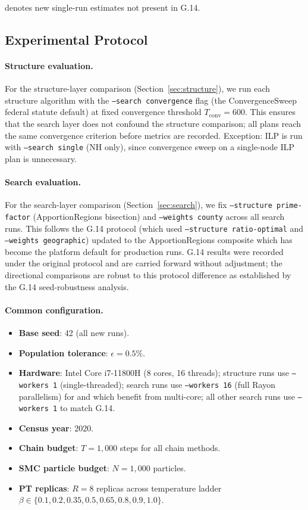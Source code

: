 \dag{} denotes new single-run estimates not present in G.14.

\subsection{Experimental Protocol}

\paragraph{Structure evaluation.}
For the structure-layer comparison (Section~\ref{sec:structure}), we run each
structure algorithm with the \texttt{--search convergence} flag (the
ConvergenceSweep federal statute default) at fixed convergence threshold
$T_{\mathrm{conv}} = 600$.
This ensures that the search layer does not confound the structure comparison;
all plans reach the same convergence criterion before metrics are recorded.
Exception: ILP is run with \texttt{--search single} (NH only), since
convergence sweep on a single-node ILP plan is unnecessary.

\paragraph{Search evaluation.}
For the search-layer comparison (Section~\ref{sec:search}), we fix
\texttt{--structure prime-factor} (ApportionRegions bisection) and
\texttt{--weights county} across all search runs.
This follows the G.14 protocol (which used \texttt{--structure ratio-optimal}
and \texttt{--weights geographic}) updated to the ApportionRegions composite
which has become the platform default for production runs.
G.14 results were recorded under the original protocol and are carried forward
without adjustment; the directional comparisons are robust to this protocol
difference as established by the G.14 seed-robustness analysis.

\paragraph{Common configuration.}
\begin{itemize}
  \item \textbf{Base seed}: 42 (all new runs).
  \item \textbf{Population tolerance}: $\epsilon = 0.5\%$.
  \item \textbf{Hardware}: Intel Core i7-11800H (8 cores, 16 threads);
        structure runs use \texttt{--workers 1} (single-threaded);
        search runs use \texttt{--workers 16} (full Rayon parallelism)
        for \pt{} and \ams{} which benefit from multi-core; all other
        search runs use \texttt{--workers 1} to match G.14.
  \item \textbf{Census year}: 2020.
  \item \textbf{Chain budget}: $T = 1{,}000$ steps for all chain methods.
  \item \textbf{SMC particle budget}: $N = 1{,}000$ particles.
  \item \textbf{PT replicas}: $R = 8$ replicas across temperature ladder
        $\beta \in \{0.1, 0.2, 0.35, 0.5, 0.65, 0.8, 0.9, 1.0\}$.
\end{itemize}

